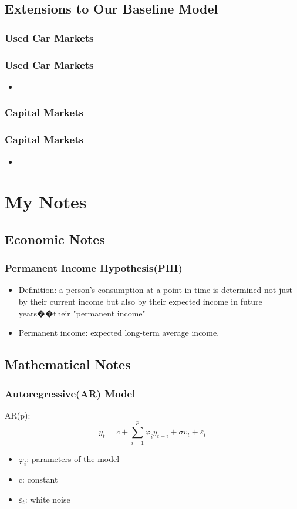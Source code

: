 \documentclass{beamer}
\begin{document}
\subsection{Extensions to Our Baseline Model}
\subsubsection{Used Car Markets}
\begin{frame}
\frametitle{Used Car Markets}
\begin{itemize}
\item
\end{itemize}
\end{frame}

\subsubsection{Capital Markets}
\begin{frame}
\frametitle{Capital Markets}
\begin{itemize}
\item
\end{itemize}
\end{frame}

\section{My Notes}
\subsection{Economic Notes}
\begin{frame}
\frametitle{Permanent Income Hypothesis(PIH)}
\begin{itemize}
\item Definition: a person's consumption at a point in time is determined not just by their current income but also by their expected income in future years��their "permanent income"
\item Permanent income: expected long-term average income.
\end{itemize}
\end{frame}

\subsection{Mathematical Notes}

\begin{frame}
\frametitle{Autoregressive(AR) Model\footnotemark}
AR(p):
$$
y_t = c + \sum_{i=1}^{p}\varphi_i y_{t-i}+\sigma v_t + \varepsilon_t
$$
\begin{itemize}
\item $\varphi_i$: parameters of the model
\item c: constant
\item $\varepsilon_t$: white noise
\end{itemize}
\end{frame}
\end{document}
